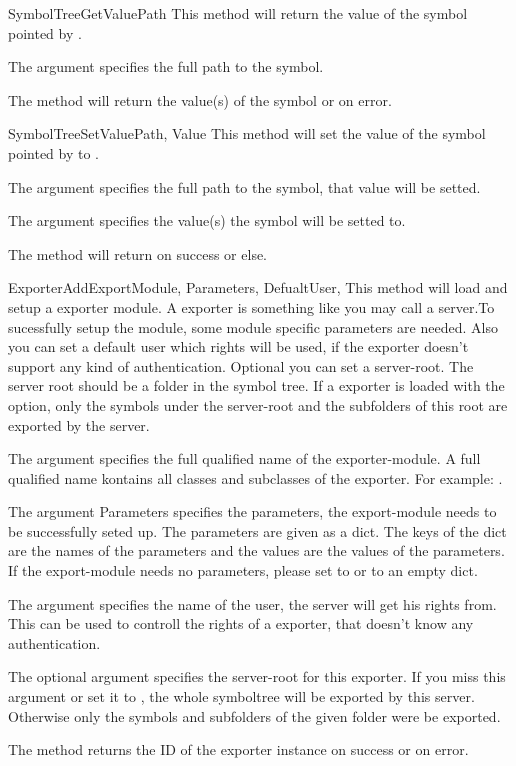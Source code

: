 \begin{methoddesc}[Core]{SymbolTreeGetValue}{Path}
This method will return the value of the symbol pointed by .

The argument  specifies the full path to the symbol. 

The method will return the value(s) of the symbol or  on error.
\end{methoddesc}

\begin{methoddesc}[Core]{SymbolTreeSetValue}{Path, Value}
This method will set the value of the symbol pointed by  to .

The argument  specifies the full path to the symbol, that value will be setted.

The argument  specifies the value(s) the symbol will be setted to.

The method will return  on success or  else.
\end{methoddesc}




\begin{methoddesc}[Core]{ExporterAdd}{ExportModule, Parameters, DefualtUser, }
This method will load and setup a exporter module. A exporter is something like
you may call a server.To sucessfully setup the module, some module specific 
parameters are needed. Also you can set a default user which rights will be 
used, if the exporter doesn't support any kind of authentication. Optional you can set 
a server-root. The server root should be a folder in the symbol tree. If a exporter 
is loaded with the  option, only the symbols under the server-root 
and the subfolders of this root are exported by the server.

The argument  specifies the full qualified name of the 
exporter-module. A full qualified name kontains all classes and subclasses of 
the exporter. For example: . 

The argument Parameters specifies the parameters, the export-module needs to be
successfully seted up. The parameters are given as a dict. The keys of the dict
are the names of the parameters and the values are the values of the 
parameters. If the export-module needs no parameters, please set 
 to  or to an empty dict.

The argument  specifies the name of the user, the server will 
get his rights from. This can be used to controll the rights of a exporter,
that doesn't know any authentication.

The optional argument  specifies the server-root for this exporter. 
If you miss this argument or set it to , the whole symboltree
will be exported by this server. Otherwise only the symbols and subfolders of
the given folder were be exported.

The method returns the ID of the exporter instance on success or 
on error.
\end{methoddesc}

